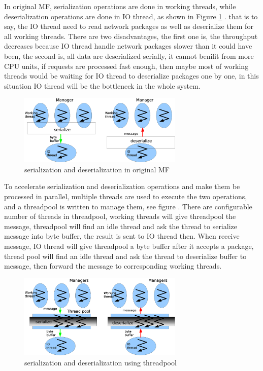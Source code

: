 \documentclass[a4paper,10pt]{article}
\begin{document}
In original MF, serialization operations are done in working threads, while deserialization operations are done in IO thread, 
as shown in Figure \ref{fig:serial_orig}  . that is to say, the IO thread need to read network packages as well as deserialize them for all working threads. 
There are two disadvantages, the first one is, the throughput decreases because IO thread handle network packages slower than it could have been, 
the second is, all data are deserialized serially, it cannot benifit from more CPU units, if requests are processed fast enough,
then maybe most of working threads would be waiting for IO thread to deserialize packages one by one, in this situation IO thread will be the bottleneck in the whole system.

\begin{figure}[!ht]\centering
  \includegraphics[width=0.7\textwidth]{serial_orig.eps}
  \caption{serialization and deserialization in original MF}\label{fig:serial_orig}
\end{figure}

To accelerate serialization and deserialization operations and make them be processed in parallel,
multiple threads are used to execute the two operations, and a threadpool is written to manage them, see figure  .
There are configurable number of threads in threadpool, working threads will give threadpool the message,
threadpool will find an idle thread and ask the thread to serialize message into byte buffer, the result is sent to IO thread then.
When receive message, IO thread will give threadpool a byte buffer after it accepts a package,
thread pool will find an idle thread and ask the thread to deserialize buffer to message,
then forward the message to corresponding working threads.

\begin{figure}[!ht]\centering
  \includegraphics[width=0.7\textwidth]{serial_threadpool.eps}
  \caption{serialization and deserialization using threadpool}\label{fig:serial_theadpool}
\end{figure}
\end{document}

